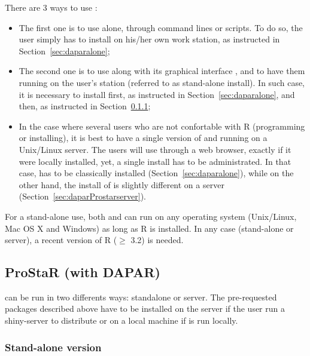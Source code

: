 \documentclass[12pt]{article}
\begin{document}
There are 3 ways to use :
\begin{itemize}
\item The first one is to use  alone, through command lines or 
scripts. To do so, the user simply has to install  on his/her 
own work station, as instructed in Section~\ref{sec:daparalone};
\item The second one is to use  along with its graphical 
interface , and to have them running on the user's station 
(referred to as stand-alone install). In such case, it is necessary to install
 first, as instructed in Section~\ref{sec:daparalone}, and
 then, as instructed in 
Section~\ref{sec:daparProstarstandalone};
\item In the case where several  users who are not 
confortable with R (programming or installing), it is best to have a single 
version of  and  running on a Unix/Linux 
server. The users will use  through a web browser, exactly 
if it were locally installed, yet, a single install has to be administrated. 
In that case,  has to be classically installed 
(Section~\ref{sec:daparalone}), while on the other hand,  the install of 
 is slightly different on a server 
(Section~\ref{sec:daparProstarserver}).
\end{itemize}
For a stand-alone use, both  and  can run on 
any operating system (Unix/Linux, Mac OS X and Windows) as long as R is 
installed. 
In any case (stand-alone or server), a recent version of R ($\geq$ 3.2) is 
needed.


\subsection{ProStaR (with DAPAR)}\label{sec:daparProstar}

 can be run in two differents ways: standalone or server. The 
pre-requested packages described above have to be installed on the server if 
the user run a shiny-server to distribute  or on a local 
machine if  is run locally.



\subsubsection{Stand-alone version}\label{sec:daparProstarstandalone}
\end{document}
